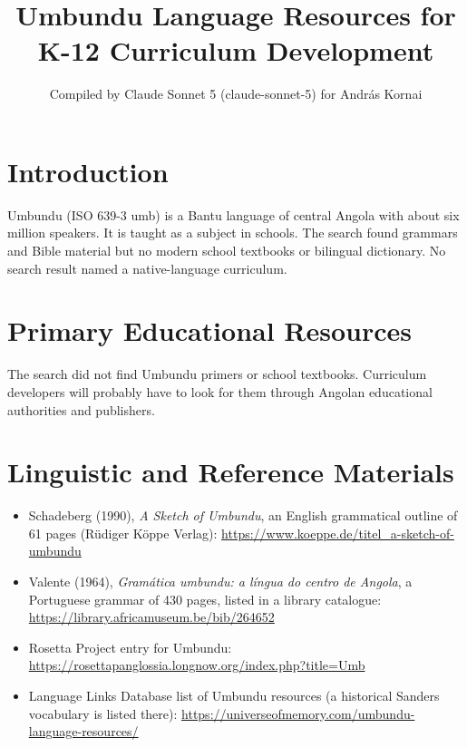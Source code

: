 \documentclass[12pt]{article}
\title{Umbundu Language Resources for K-12 Curriculum Development}
\author{Compiled by Claude Sonnet 5 (claude-sonnet-5) for Andr\'as Kornai}
\date{}
\begin{document}
\maketitle

\section{Introduction}
Umbundu (ISO 639-3 umb) is a Bantu language of central Angola with about six million speakers. It is taught as a subject in schools. The search found grammars and Bible material but no modern school textbooks or bilingual dictionary. No search result named a native-language curriculum.

\section{Primary Educational Resources}
The search did not find Umbundu primers or school textbooks. Curriculum developers will probably have to look for them through Angolan educational authorities and publishers.

\section{Linguistic and Reference Materials}
\begin{itemize}
\item Schadeberg (1990), \emph{A Sketch of Umbundu}, an English grammatical outline of 61 pages (R\"udiger K\"oppe Verlag): \url{https://www.koeppe.de/titel_a-sketch-of-umbundu}
\item Valente (1964), \emph{Gram\'atica umbundu: a l\'ingua do centro de Angola}, a Portuguese grammar of 430 pages, listed in a library catalogue: \url{https://library.africamuseum.be/bib/264652}
\item Rosetta Project entry for Umbundu: \url{https://rosettapanglossia.longnow.org/index.php?title=Umb}
\item Language Links Database list of Umbundu resources (a historical Sanders vocabulary is listed there): \url{https://universeofmemory.com/umbundu-language-resources/}
\end{itemize}
\end{document}
